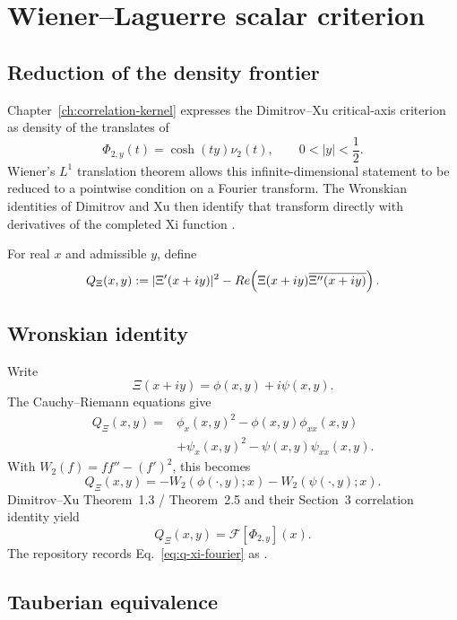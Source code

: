 \chapter{Wiener--Laguerre scalar criterion}\label{ch:wiener-laguerre-scalar}

\section{Reduction of the density frontier}

Chapter~\ref{ch:correlation-kernel} expresses the Dimitrov--Xu critical-axis criterion as density of the translates of
\[
\Phi_{2,y}(t)=\cosh(ty)\nu_2(t),
\qquad
0<|y|<\frac12.
\]
Wiener's $L^1$ translation theorem allows this infinite-dimensional statement to be reduced to a pointwise condition on a Fourier transform.  The Wronskian identities of Dimitrov and Xu then identify that transform directly with derivatives of the completed Xi function \cite{DimitrovXu2016}.

For real $x$ and admissible $y$, define
\begin{equation}\label{eq:q-xi-definition}
Q_\Xi(x,y)
:=
|\Xi'(x+iy)|^2
-Re\!\left(
\Xi(x+iy)\overline{\Xi''(x+iy)}
\right).
\end{equation}

\section{Wronskian identity}

Write
\[
\Xi(x+iy)=\phi(x,y)+i\psi(x,y).
\]
The Cauchy--Riemann equations give
\begin{align}
Q_\Xi(x,y)
={}&\phi_x(x,y)^2-\phi(x,y)\phi_{xx}(x,y)\\
&+\psi_x(x,y)^2-\psi(x,y)\psi_{xx}(x,y).
\end{align}
With $W_2(f)=ff''-(f')^2$, this becomes
\begin{equation}\label{eq:q-xi-wronskian}
Q_\Xi(x,y)
=-W_2(\phi(\cdot,y);x)-W_2(\psi(\cdot,y);x).
\end{equation}
Dimitrov--Xu Theorem~1.3 / Theorem~2.5 and their Section~3 correlation identity yield
\begin{equation}\label{eq:q-xi-fourier}
\boxed{
Q_\Xi(x,y)=\mathcal F[\Phi_{2,y}](x).
}
\end{equation}
The repository records Eq.~\eqref{eq:q-xi-fourier} as .

\section{Tauberian equivalence}

